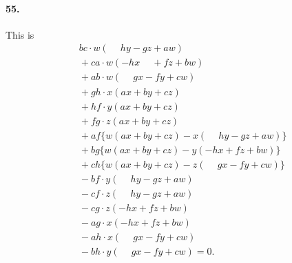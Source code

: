 \documentclass[11pt,a4paper]{article}
\begin{document}
\paragraph{55.}
This is
\begin{align*}
&bc\cdot w(\phantom{-} hy - gz + aw) \\
&{}+ ca\cdot w(-hx \phantom{+}+ fz + bw) \\
&{}+ ab\cdot w(\phantom{-} gx - fy + cw) \\
&{}+ gh\cdot x(ax + by + cz) \\
&{}+ hf\cdot y(ax + by + cz) \\
&{}+ fg\cdot z(ax + by + cz) \\
&{}+ af\bigl\{w(ax + by + cz) - x(\phantom{-} hy - gz + aw)\bigr\} \\
&{}+ bg\bigl\{w(ax + by + cz) - y(-hx + fz + bw)\bigr\} \\
&{}+ ch\bigl\{w(ax + by + cz) - z(\phantom{-} gx - fy + cw)\bigr\} \\
&{}- bf\cdot y(\phantom{-} hy - gz + aw) \\
&{}- cf\cdot z(\phantom{-} hy - gz + aw) \\
&{}- cg\cdot z(-hx + fz + bw) \\
&{}- ag\cdot x(-hx + fz + bw) \\
&{}- ah\cdot x(\phantom{-} gx - fy + cw) \\
&{}- bh\cdot y(\phantom{-} gx - fy + cw) = 0.
\end{align*}
\end{document}

